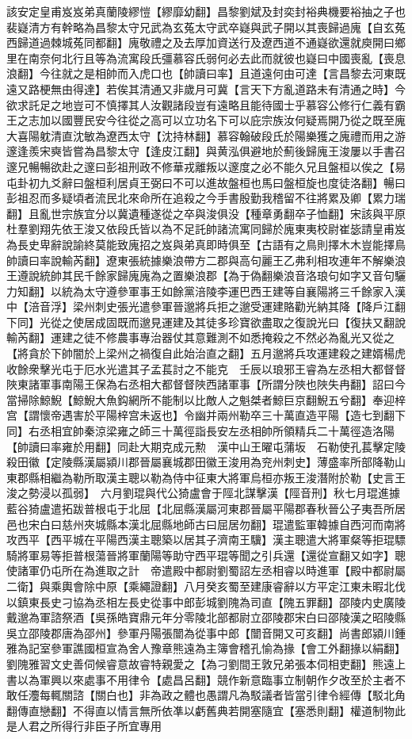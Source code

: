 該安定皇甫岌岌弟真蘭陵繆愷【繆靡幼翻】昌黎劉斌及封奕封裕典機要裕抽之子也裴嶷清方有幹略為昌黎太守兄武為玄菟太守武卒嶷與武子開以其喪歸過廆【自玄菟西歸道過棘城菟同都翻】廆敬禮之及去厚加資送行及遼西道不通嶷欲還就庾開曰鄉里在南奈何北行且等為流寓段氏彊慕容氏弱何必去此而就彼也嶷曰中國喪亂【喪息浪翻】今往就之是相帥而入虎口也【帥讀曰率】且道遠何由可達【言昌黎去河東既遠又路梗無由得達】若俟其清通又非歲月可冀【言天下方亂道路未有清通之時】今欲求託足之地豈可不慎擇其人汝觀諸段豈有遠略且能待國士乎慕容公修行仁義有霸王之志加以國豐民安今往從之高可以立功名下可以庇宗族汝何疑焉開乃從之既至廆大喜陽躭清直沈敏為遼西太守【沈持林翻】慕容翰破段氏於陽樂獲之廆禮而用之游邃逢羨宋奭皆嘗為昌黎太守【逢皮江翻】與黄泓俱避地於薊後歸廆王浚屢以手書召邃兄暢暢欲赴之邃曰彭祖刑政不修華戎離叛以邃度之必不能久兄且盤桓以俟之【易屯卦初九爻辭曰盤桓利居貞王弼曰不可以進故盤桓也馬曰盤桓旋也度徒洛翻】暢曰彭祖忍而多疑頃者流民北來命所在追殺之今手書殷勤我稽留不往將累及卿【累力瑞翻】且亂世宗族宜分以冀遺種遂從之卒與浚俱没【種章勇翻卒子恤翻】宋該與平原杜羣劉翔先依王浚又依段氏皆以為不足託帥諸流寓同歸於廆東夷校尉崔毖請皇甫岌為長史卑辭說諭終莫能致廆招之岌與弟真即時俱至【古語有之鳥則擇木木豈能擇鳥帥讀曰率說輸芮翻】遼東張統據樂浪帶方二郡與高句麗王乙弗利相攻連年不解樂浪王遵說統帥其民千餘家歸廆廆為之置樂浪郡【為于偽翻樂浪音洛琅句如字又音句驪力知翻】以統為太守遵參軍事王如餘黨涪陵李運巴西王建等自襄陽將三千餘家入漢中【涪音浮】梁州刺史張光遣參軍晉邈將兵拒之邈受運建賂勸光納其降【降戶江翻下同】光從之使居成固既而邈見運建及其徒多珍寶欲盡取之復說光曰【復扶又翻說輸芮翻】運建之徒不修農事專治器仗其意難測不如悉掩殺之不然必為亂光又從之【將貪於下帥闇於上梁州之禍復自此始治直之翻】五月邈將兵攻運建殺之建婿楊虎收餘衆擊光屯于厄水光遣其子孟萇討之不能克　壬辰以琅邪王睿為左丞相大都督督陜東諸軍事南陽王保為右丞相大都督督陜西諸軍事【所謂分陜也陜失冉翻】詔曰今當掃除鯨鯢【鯨鯢大魚鈎網所不能制以比敵人之魁桀者鯨巨京翻鯢五兮翻】奉迎梓宫【謂懷帝遇害於平陽梓宫未返也】令幽并兩州勒卒三十萬直造平陽【造七到翻下同】右丞相宜帥秦涼梁雍之師三十萬徑詣長安左丞相帥所領精兵二十萬徑造洛陽【帥讀曰率雍於用翻】同赴大期克成元勲　漢中山王曜屯蒲坂　石勒使孔萇擊定陵殺田徽【定陵縣漢屬潁川郡晉屬襄城郡田徽王浚用為兖州刺史】薄盛率所部降勒山東郡縣相繼為勒所取漢主聰以勒為侍中征東大將軍烏桓亦叛王浚潛附於勒【史言王浚之勢浸以孤弱】　六月劉琨與代公猗盧會于陘北謀擊漢【陘音刑】秋七月琨進據藍谷猗盧遣拓跋普根屯于北屈【北屈縣漢屬河東郡晉屬平陽郡春秋晉公子夷吾所居邑也宋白曰慈州夾城縣本漢北屈縣地師古曰屈居勿翻】琨遣監軍韓據自西河而南將攻西平【西平城在平陽西漢主聰築以居其子濟南王驥】漢主聰遣大將軍粲等拒琨驃騎將軍易等拒普根蕩晉將軍蘭陽等助守西平琨等聞之引兵還【還從宣翻又如字】聰使諸軍仍屯所在為進取之計　帝遣殿中都尉劉蜀詔左丞相睿以時進軍【殿中都尉屬二衛】與乘輿會除中原【乘繩證翻】八月癸亥蜀至建康睿辭以方平定江東未暇北伐以鎮東長史刁協為丞相左長史從事中郎彭城劉隗為司直【隗五罪翻】邵陵内史廣陵戴邈為軍諮祭酒【吳孫皓寶鼎元年分零陵北部都尉立邵陵郡宋白曰邵陵漢之昭陵縣吳立邵陵郡唐為邵州】參軍丹陽張闓為從事中郎【闓音開又可亥翻】尚書郎潁川鍾雅為記室參軍譙國桓宣為舍人豫章熊遠為主簿會稽孔愉為掾【會工外翻掾以絹翻】劉隗雅習文史善伺候睿意故睿特親愛之【為刁劉間王敦兄弟張本伺相吏翻】熊遠上書以為軍興以來處事不用律令【處昌呂翻】競作新意臨事立制朝作夕改至於主者不敢任灋每輒關諮【關白也】非為政之體也愚謂凡為駁議者皆當引律令經傳【駁北角翻傳直戀翻】不得直以情言無所依凖以虧舊典若開塞隨宜【塞悉則翻】權道制物此是人君之所得行非臣子所宜專用